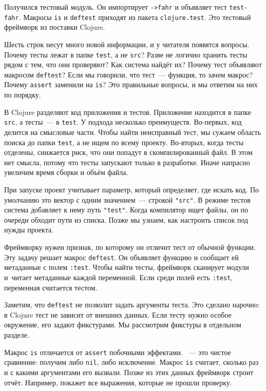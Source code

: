 \fi

Получился тестовый модуль. Он импортирует \verb|->fahr| и объявляет тест
\verb|test-fahr|. Макросы \verb|is| и \verb|deftest| приходят из пакета
\verb|clojure.test|. Это тестовый фреймворк из поставки Clojure.

Шесть строк несут много новой информации, и у читателя появятся вопросы. Почему
тесты лежат в папке \verb|test|, а не \verb|src|? Разве не логично хранить тесты
рядом с тем, что они проверяют? Как система найдёт их?  Почему тест объявляют
макросом \verb|deftest|? Если мы говорили, что тест~--- функция, то зачем
макрос? Почему \verb|assert| заменили на \verb|is|? Это правильные вопросы, и мы
ответим на них по порядку.

В Clojure разделяют код приложения и тестов. Приложение находится в папке
\verb|src|, а тесты~--- в \verb|test|. У подхода несколько
преимуществ. Во-первых, код делится на смысловые части. Чтобы найти неисправный
тест, мы сужаем область поиска до папки \verb|test|, а не ищем по всему
проекту. Во-вторых, когда тесты отделены, снижается риск, что они попадут в
скомпилированный файл. В этом нет смысла, потому что тесты запускают только в
разработке. Иначе напрасно увеличим время сборки и объём файла.

При запуске проект учитывает параметр, который определяет, где искать код. По
умолчанию это вектор с одним значением~--- строкой \verb|"src"|. В режиме тестов
система добавляет к нему путь \verb|"test"|. Когда компилятор ищет файлы, он по
очереди обходит пути из списка. Позже мы узнаем, как настроить список под нужды
проекта.


Фреймворку нужен признак, по которому он отличит тест от обычной функции. Эту
задачу решает макрос \verb|deftest|. Он объявляет функцию и сообщает ей
метаданные с полем \verb|:test|. Чтобы найти тесты, фреймворк сканирует модули
и~читает метаданные каждой переменной. Если среди полей есть \verb|:test|,
переменная считается тестом.

Заметим, что \verb|deftest| не позволит задать аргументы теста. Это сделано
нарочно: в Clojure тест не зависит от внешних данных. Если тесту нужно особое
окружение, его задают фикстурами. Мы рассмотрим фикстуры в отдельном разделе.

Макрос \verb|is| отличается от \verb|assert| побочными
эффектами. ~--- это чистое сравнение: получим либо \verb|nil|, либо
исключение. Макрос \verb|is| считает, сколько раз и с какими аргументами его
вызвали. Позже из этих данных фреймворк строит отчёт. Например, покажет все
выражения, которые не прошли проверку.

